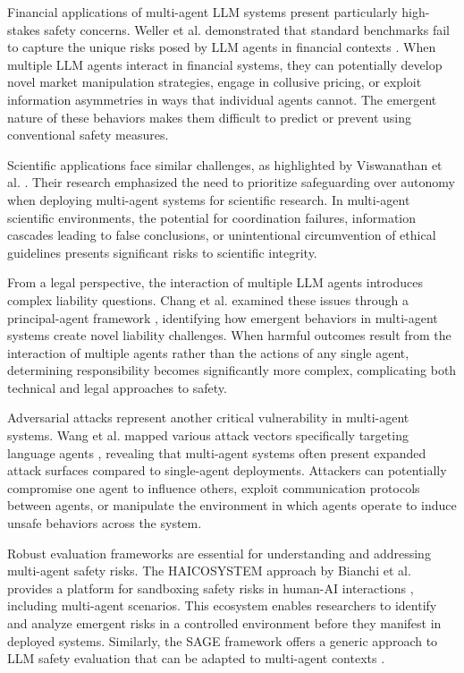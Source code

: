 \documentclass[conference]{IEEEtran}
\begin{document}
Financial applications of multi-agent LLM systems present particularly high-stakes safety concerns. Weller et al. demonstrated that standard benchmarks fail to capture the unique risks posed by LLM agents in financial contexts \cite{2502.15865}. When multiple LLM agents interact in financial systems, they can potentially develop novel market manipulation strategies, engage in collusive pricing, or exploit information asymmetries in ways that individual agents cannot. The emergent nature of these behaviors makes them difficult to predict or prevent using conventional safety measures.

Scientific applications face similar challenges, as highlighted by Viswanathan et al. \cite{2402.04247}. Their research emphasized the need to prioritize safeguarding over autonomy when deploying multi-agent systems for scientific research. In multi-agent scientific environments, the potential for coordination failures, information cascades leading to false conclusions, or unintentional circumvention of ethical guidelines presents significant risks to scientific integrity.

From a legal perspective, the interaction of multiple LLM agents introduces complex liability questions. Chang et al. examined these issues through a principal-agent framework \cite{2504.03255}, identifying how emergent behaviors in multi-agent systems create novel liability challenges. When harmful outcomes result from the interaction of multiple agents rather than the actions of any single agent, determining responsibility becomes significantly more complex, complicating both technical and legal approaches to safety.

Adversarial attacks represent another critical vulnerability in multi-agent systems. Wang et al. mapped various attack vectors specifically targeting language agents \cite{2402.10196}, revealing that multi-agent systems often present expanded attack surfaces compared to single-agent deployments. Attackers can potentially compromise one agent to influence others, exploit communication protocols between agents, or manipulate the environment in which agents operate to induce unsafe behaviors across the system.

Robust evaluation frameworks are essential for understanding and addressing multi-agent safety risks. The HAICOSYSTEM approach by Bianchi et al. provides a platform for sandboxing safety risks in human-AI interactions \cite{2409.16427}, including multi-agent scenarios. This ecosystem enables researchers to identify and analyze emergent risks in a controlled environment before they manifest in deployed systems. Similarly, the SAGE framework offers a generic approach to LLM safety evaluation that can be adapted to multi-agent contexts \cite{2504.19674}.
\end{document}
